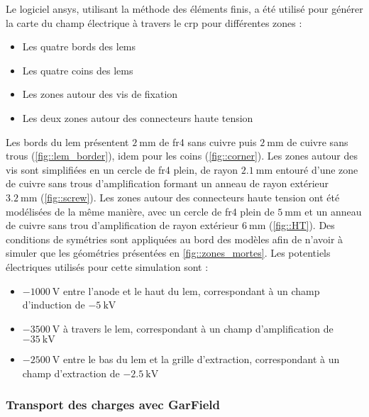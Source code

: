                 Le logiciel \gls{ansys}, utilisant la méthode des éléments finis, a été utilisé pour générer la carte du champ électrique à travers le \gls{crp} pour différentes zones : 
                \begin{itemize}
                    \item Les quatre bords des \glspl{lem}
                    \item Les quatre coins des \glspl{lem}
                    \item Les zones autour des vis de fixation
                    \item Les deux zones autour des connecteurs haute tension
                \end{itemize}
                Les bords du \gls{lem} présentent $\SI{2}{\milli\meter}$ de \gls{fr4} sans cuivre puis $\SI{2}{\milli\meter}$ de cuivre sans trous (\autoref{fig::lem_border}), idem pour les coins (\autoref{fig::corner}). Les zones autour des vis sont simplifiées en un cercle de \gls{fr4} plein, de rayon $\SI{2.1}{\milli\meter}$ entouré d'une zone de cuivre sans trous d'amplification formant un anneau de rayon extérieur $\SI{3.2}{\milli\meter}$ (\autoref{fig::screw}). Les zones autour des connecteurs haute tension ont été modélisées de la même manière, avec un cercle de \gls{fr4} plein de $\SI{5}{\milli\meter}$ et un anneau de cuivre sans trou d'amplification de rayon extérieur $\SI{6}{\milli\meter}$ (\autoref{fig::HT}). Des conditions de symétries sont appliquées au bord des modèles afin de n'avoir à simuler que les géométries présentées en \autoref{fig::zones_mortes}. 
                Les potentiels électriques utilisés pour cette simulation sont : 
                \begin{itemize}
                    \item $\SI{-1000}{\volt}$ entre l'anode et le haut du \gls{lem}, correspondant à un champ d'induction de $\SI{-5}{\kilo\volt}$
                    \item $\SI{-3500}{\volt}$ à travers le \gls{lem}, correspondant à un champ d'amplification de $\SI{-35}{\kilo\volt}$
                    \item $\SI{-2500}{\volt}$ entre le bas du \gls{lem} et la grille d'extraction, correspondant à un champ d'extraction de $\SI{-2.5}{\kilo\volt}$
                \end{itemize}
                
            \subsubsection{Transport des charges avec GarField}
            
